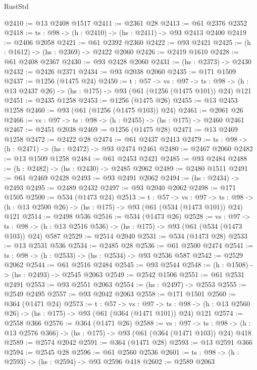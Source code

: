 \begin{lexlean}{RustStd}
\begin{coremodule}
@2410 := @13 @2408 @1517
@2411 := @2361 @28
@2413 := @61 @2376 @2352
@2418 := {ts : @98} -> (h : @2410) -> (hs : @2411) -> @93 @2413 @2400
@2419 := @2406 @2058
@2421 := @61 @2392 @2360
@2422 := @93 @2421
@2425 := (h : @1612) -> (hs : @2369) -> @2422 @2060
@2426 := @2419 @1610
@2428 := @61 @2408 @2367
@2430 := @93 @2428 @2060
@2431 := (hs : @2373) -> @2430
@2432 := @2426 @2371
@2434 := @93 @2038 @2060
@2435 := @171 @1509
@2437 := @1256 (@1475 @24)
@2450 := {t : @57} ->
  {vs : @97} ->
  {ts : @98} -> (h : @13 @2437 @26) -> (hs : @175) -> @93 (@61 (@1256 (@1475 @101)) @24) @121
@2451 := @2435 @1258
@2453 := @1256 (@1475 @26)
@2455 := @13 @2453 @1258
@2460 := @93 (@61 (@1256 (@1475 @103)) @24)
@2461 := @2061 @26
@2466 := {vs : @97} -> {ts : @98} -> (h : @2455) -> (hs : @175) -> @2460 @2461
@2467 := @2451 @2038
@2469 := @1256 (@1475 @28)
@2471 := @13 @2469 @1258
@2472 := @2422 @28
@2474 := @61 @2437 @2413
@2479 := {ts : @98} -> (h : @2471) -> (hs : @2472) -> @93 @2474 @2461
@2480 := @2467 @2060
@2482 := @13 @1509 @1258
@2484 := @61 @2453 @2421
@2485 := @93 @2484
@2488 := (h : @2482) -> (hs : @2430) -> @2485 @2062
@2489 := @2480 @1511
@2491 := @61 @2469 @2428
@2493 := @93 @2491 @2062
@2494 := (hs : @2434) -> @2493
@2495 := @2489 @2432
@2497 := @93 @2040 @2062
@2498 := @171 @1505
@2500 := @534 (@1473 @24)
@2513 := {t : @57} ->
  {vs : @97} ->
  {ts : @98} -> (h : @13 @2500 @26) -> (hs : @175) -> @93 (@61 (@534 (@1473 @101)) @24) @121
@2514 := @2498 @536
@2516 := @534 (@1473 @26)
@2528 := {vs : @97} ->
  {ts : @98} -> (h : @13 @2516 @536) -> (hs : @175) -> @93 (@61 (@534 (@1473 @103)) @24) @587
@2529 := @2514 @2040
@2531 := @534 (@1473 @28)
@2533 := @13 @2531 @536
@2534 := @2485 @28
@2536 := @61 @2500 @2474
@2541 := {ts : @98} -> (h : @2533) -> (hs : @2534) -> @93 @2536 @587
@2542 := @2529 @2062
@2544 := @61 @2516 @2484
@2545 := @93 @2544
@2548 := (h : @1508) -> (hs : @2493) -> @2545 @2063
@2549 := @2542 @1506
@2551 := @61 @2531 @2491
@2553 := @93 @2551 @2063
@2554 := (hs : @2497) -> @2553
@2555 := @2549 @2495
@2557 := @93 @2042 @2063
@2558 := @171 @1501
@2560 := @364 (@1471 @24)
@2573 := {t : @57} ->
  {vs : @97} ->
  {ts : @98} -> (h : @13 @2560 @26) -> (hs : @175) -> @93 (@61 (@364 (@1471 @101)) @24) @121
@2574 := @2558 @366
@2576 := @364 (@1471 @26)
@2588 := {vs : @97} ->
  {ts : @98} -> (h : @13 @2576 @366) -> (hs : @175) -> @93 (@61 (@364 (@1471 @103)) @24) @418
@2589 := @2574 @2042
@2591 := @364 (@1471 @28)
@2593 := @13 @2591 @366
@2594 := @2545 @28
@2596 := @61 @2560 @2536
@2601 := {ts : @98} -> (h : @2593) -> (hs : @2594) -> @93 @2596 @418
@2602 := @2589 @2063

\end{coremodule}
\end{lexlean}
